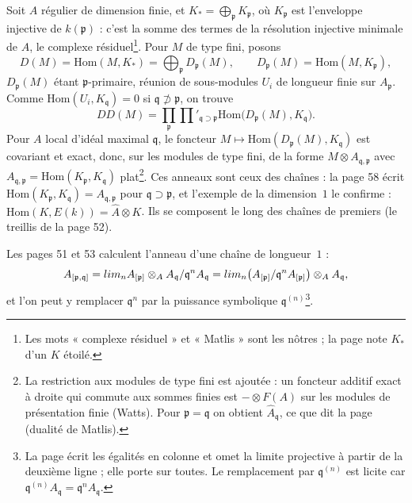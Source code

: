 \documentclass[11pt,a4paper]{article}
\begin{document}
Soit $A$ régulier de dimension finie, et $K_* = \bigoplus_{\mathfrak{p}}
K_{\mathfrak{p}}$, où $K_{\mathfrak{p}}$ est l'enveloppe injective de
$k(\mathfrak{p})$ : c'est la somme des termes de la résolution injective minimale
de $A$, le complexe résiduel\footnote{Les mots « complexe résiduel » et
« Matlis » sont les nôtres ; la page note $K_*$ d'un $K$ étoilé.}. Pour $M$ de
type fini, posons
\[
D(M) = \mathrm{Hom}(M, K_*) = \bigoplus_{\mathfrak{p}} D_{\mathfrak{p}}(M),
\qquad D_{\mathfrak{p}}(M) = \mathrm{Hom}(M, K_{\mathfrak{p}}),
\]
$D_{\mathfrak{p}}(M)$ étant $\mathfrak{p}$-primaire, réunion de sous-modules
$U_i$ de longueur finie sur $A_{\mathfrak{p}}$. Comme $\mathrm{Hom}(U_i,
K_{\mathfrak{q}}) = 0$ si $\mathfrak{q} \not\supset \mathfrak{p}$, on trouve
\[
DD(M) = \prod_{\mathfrak{p}} \prod'_{\mathfrak{q} \supset \mathfrak{p}}
\mathrm{Hom}\bigl(D_{\mathfrak{p}}(M), K_{\mathfrak{q}}\bigr).
\]
Pour $A$ local d'idéal maximal $\mathfrak{q}$, le foncteur $M \mapsto
\mathrm{Hom}(D_{\mathfrak{p}}(M), K_{\mathfrak{q}})$ est covariant et exact, donc,
sur les modules de type fini, de la forme $M \otimes A_{\mathfrak{q},\mathfrak{p}}$
avec $A_{\mathfrak{q},\mathfrak{p}} = \mathrm{Hom}(K_{\mathfrak{p}},
K_{\mathfrak{q}})$ plat\footnote{La restriction aux modules de type fini est
ajoutée : un foncteur additif exact à droite qui commute aux sommes finies est
$- \otimes F(A)$ sur les modules de présentation finie (Watts). Pour
$\mathfrak{p} = \mathfrak{q}$ on obtient $\hat A_{\mathfrak{q}}$, ce que dit la page
(dualité de Matlis).}. Ces anneaux sont ceux des chaînes : la page 58 écrit
$\mathrm{Hom}(K_{\mathfrak{p}}, K_{\mathfrak{q}}) = A_{\mathfrak{q},\mathfrak{p}}$ pour
$\mathfrak{q} \supset \mathfrak{p}$, et l'exemple de la dimension~$1$ le confirme :
$\mathrm{Hom}(K, E(k)) = \hat A \otimes K$. Ils se composent le long des chaînes
de premiers (le treillis de la page 52).

Les pages 51 et 53 calculent l'anneau d'une chaîne de longueur~$1$ :
\[
A_{[\mathfrak{p},\mathfrak{q}]} = \varprojlim_n A_{[\mathfrak{p}]} \otimes_A
A_{\mathfrak{q}}/\mathfrak{q}^n A_{\mathfrak{q}}
= \varprojlim_n \bigl(A_{[\mathfrak{p}]}/\mathfrak{q}^n A_{[\mathfrak{p}]}\bigr)
\otimes_A A_{\mathfrak{q}},
\]
et l'on peut y remplacer $\mathfrak{q}^n$ par la puissance symbolique
$\mathfrak{q}^{(n)}$\footnote{La page écrit les égalités en colonne et omet la
limite projective à partir de la deuxième ligne ; elle porte sur toutes.
Le remplacement par $\mathfrak{q}^{(n)}$ est licite car $\mathfrak{q}^{(n)}
A_{\mathfrak{q}} = \mathfrak{q}^n A_{\mathfrak{q}}$.}.
\end{document}
